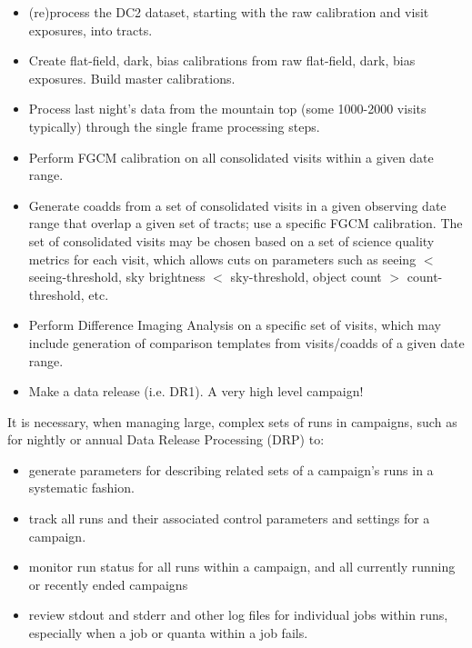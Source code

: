 \documentclass[DM,authoryear,toc]{lsstdoc}
\begin{document}
\begin{itemize}

\item (re)process the DC2 dataset, starting with the raw calibration and 
visit exposures, into tracts.  

\item Create flat-field, dark, bias calibrations from raw flat-field,
dark, bias exposures.  Build master calibrations.

\item Process last night's data from the mountain top (some 1000-2000 visits 
typically) through the single frame processing steps.

\item Perform FGCM calibration on all consolidated visits within a given
date range.

\item Generate coadds from a set of consolidated visits in a given observing
date range that overlap a given set of tracts; use a specific FGCM calibration.
The set of consolidated visits may be chosen based on a set of science quality 
metrics for each visit, which allows cuts on parameters such as 
seeing $<$ seeing-threshold, sky brightness $<$ sky-threshold, object count 
$>$ count-threshold, etc.

\item Perform Difference Imaging Analysis on a specific set of visits, 
which may include generation of comparison templates from visits/coadds 
of a given date range.

\item Make a data release (i.e. DR1).  A very high level campaign!

\end{itemize} 

It is necessary, when managing large, complex sets of runs in campaigns, 
such as for nightly or annual Data Release Processing (DRP) to:

\begin{itemize}

\item  generate parameters for describing related sets of a campaign's 
runs in a systematic fashion.

\item track all runs and their associated control parameters and settings
for a campaign.

\item monitor run status for all runs within a campaign, and all currently
running or recently ended campaigns

\item review stdout and stderr and other log files for individual jobs
within runs, especially when a job or quanta within a job fails.

\end {itemize}
\end{document}
